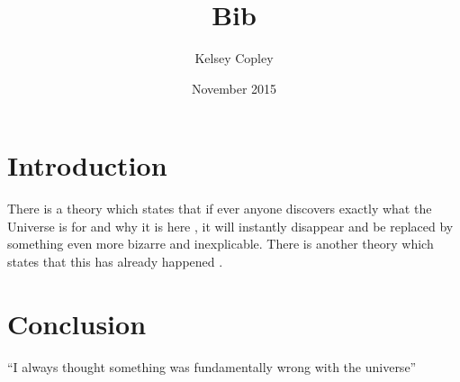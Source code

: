 \documentclass{article}
\title{Bib}
\author{Kelsey Copley }
\date{November 2015}
\begin{document}
\maketitle

\section{Introduction}
There is a theory which states that if ever anyone discovers exactly what the Universe is for and why it is here \cite{color_space}, it will instantly disappear and be replaced by something even more bizarre and inexplicable.
There is another theory which states that this has already happened \cite{color_model}.

\section{Conclusion}
``I always thought something was fundamentally wrong with the universe'' \citep{Colour}



\end{document}
